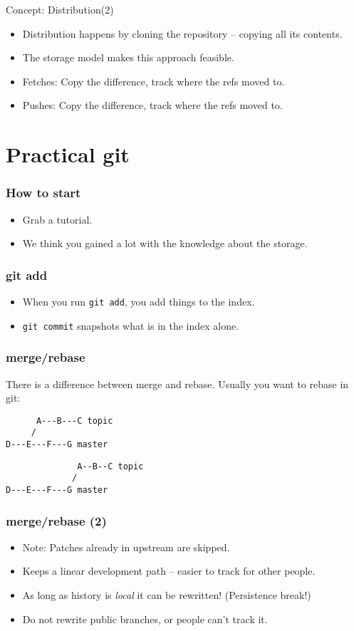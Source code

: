 \documentclass[xcolor=pdftex,dvipsnames]{beamer}
\begin{document}
\begin{frame}{Concept: Distribution(2)}
  \begin{itemize}
  \item Distribution happens by cloning the repository -- copying all
    its contents.
  \item The storage model makes this approach feasible.
  \item Fetches: Copy the difference, track where the refs moved to.
  \item Pushes:  Copy the difference, track where the refs moved to.
  \end{itemize}
\end{frame}

\section{Practical git}
\begin{frame}
  \frametitle{How to start}
  \begin{itemize}
  \item Grab a tutorial.
  \item We think you gained a lot with the knowledge about the
    storage.
  \end{itemize}
\end{frame}

\begin{frame}
  \frametitle{git add}
  \begin{itemize}
  \item When you run \texttt{git add}, you add things to the index.
  \item \texttt{git commit} snapshots what is in the index alone.
  \end{itemize}
\end{frame}

\begin{frame}[fragile]
  \frametitle{merge/rebase}
  There is a difference between merge and rebase. Usually you want to
  rebase in git:
\begin{verbatim}
      A---B---C topic
     /
D---E---F---G master
\end{verbatim}
\begin{verbatim}
              A--B--C topic
             /
D---E---F---G master
 \end{verbatim}
\end{frame}

\begin{frame}
  \frametitle{merge/rebase (2)}
  \begin{itemize}
  \item Note: Patches already in upstream are skipped.
  \item Keeps a linear development path -- easier to track for other
    people.
  \item As long as history is \emph{local} it can be rewritten!
    (Persistence break!)
  \item Do not rewrite public branches, or people can't track it.
  \end{itemize}
\end{frame}
\end{document}
